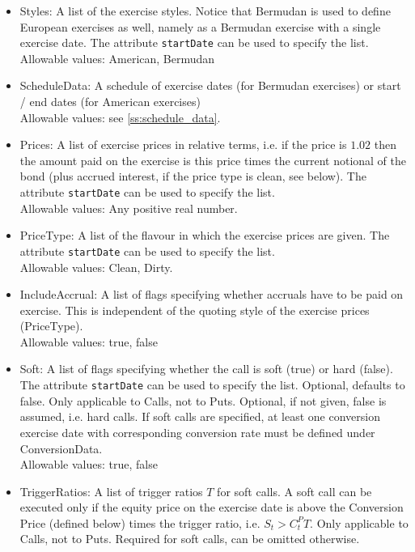 \begin{itemize}

\item Styles: A list of the exercise styles. Notice that Bermudan is used to define European exercises as well, namely
as a Bermudan exercise with a single exercise date. The attribute \verb+startDate+ can be used to specify the list. \\
Allowable values: American, Bermudan

\item ScheduleData: A schedule of exercise dates (for Bermudan exercises) or start / end dates (for American exercises) \\
  Allowable values: see \ref{ss:schedule_data}.

\item Prices: A list of exercise prices in relative terms, i.e. if the price is $1.02$ then the amount paid on the
  exercise is this price times the current notional of the bond (plus accrued interest, if the price type is clean, see
  below). The attribute \verb+startDate+ can be used to specify the list.\\
  Allowable values: Any positive real number.

\item PriceType: A list of the flavour in which the exercise prices are given. The attribute \verb+startDate+ can be
  used to specify the list.\\
  Allowable values: Clean, Dirty.

\item IncludeAccrual: A list of flags specifying whether accruals have to be paid on exercise. This is independent of
  the quoting style of the exercise prices (PriceType).\\
  Allowable values: true, false

\item Soft: A list of flags specifying whether the call is soft (true) or hard (false). The attribute \verb+startDate+
  can be used to specify the list. Optional, defaults to false. Only applicable to Calls, not to Puts. Optional, if not
  given, false is assumed, i.e. hard calls. If soft calls are specified, at least one conversion exercise date with
  corresponding conversion rate must be defined under ConversionData. \\
  Allowable values: true, false

\item TriggerRatios: A list of trigger ratios $T$ for soft calls. A soft call can be executed only if the equity price
  on the exercise date is above the Conversion Price (defined below) times the trigger ratio, i.e. $S_t > C^P_tT$. Only applicable to
  Calls, not to Puts. Required for soft calls, can be omitted otherwise.\\
  

\end{itemize}
